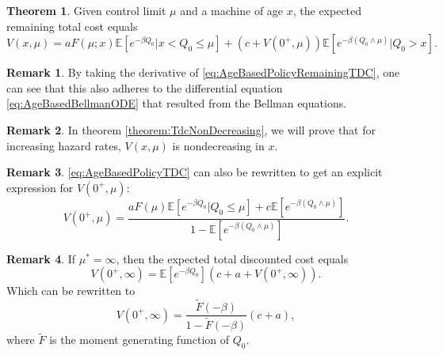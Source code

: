 \documentclass[a4paper]{thesis}
\theoremstyle{definition}
\newtheorem{remark}{Remark}[chapter]
\newtheorem{theorem}{Theorem}[section]
\begin{document}
\begin{theorem}
	Given control limit $\mu$ and a machine of age $x$, the expected remaining total cost equals 
	\begin{equation}\label{eq:AgeBasedPolicyRemainingTDC}
	V(x,\mu)=aF(\mu;x)\mathbb{E}[e^{-\beta Q_0}|x<Q_0\leq \mu]+(c+V(0^+,\mu))\mathbb{E}[e^{-\beta(Q_0\wedge\mu)}|Q_0>x].
	\end{equation}
\end{theorem}

\begin{remark}
	By taking the derivative of \eqref{eq:AgeBasedPolicyRemainingTDC}, one can see that this also adheres to the differential equation \eqref{eq:AgeBasedBellmanODE} that resulted from the Bellman equations.
\end{remark}

\begin{remark}
	In theorem \ref{theorem:TdcNonDecreasing}, we will prove that for increasing hazard rates, $V(x,\mu)$ is nondecreasing in $x$.
\end{remark}

\begin{remark}
	\eqref{eq:AgeBasedPolicyTDC} can also be rewritten to get an explicit expression for $V(0^+,\mu)$:
	\begin{equation}\label{eq:AgeBasedOptimalTDC}
	V(0^+,\mu)=\frac{aF(\mu)\mathbb{E}[e^{-\beta Q_0}|Q_0\leq \mu]+c\mathbb{E}[e^{-\beta(Q_0\wedge\mu)}]}{1-\mathbb{E}[e^{-\beta (Q_0\wedge\mu)}]}.
	\end{equation}
\end{remark}

\begin{remark}
	If $\mu^*=\infty$, then the expected total discounted cost equals
	\[V(0^+,\infty)=\mathbb{E}[e^{-\beta Q_0}](c+a+V(0^+,\infty)).\]
	Which can be rewritten to
	\[V(0^+,\infty)=\frac{\tilde{F}(-\beta)}{1-\tilde{F}(-\beta)}(c+a),\]
	where $\tilde{F}$ is the moment generating function of $Q_0$.
\end{remark}
\end{document}
